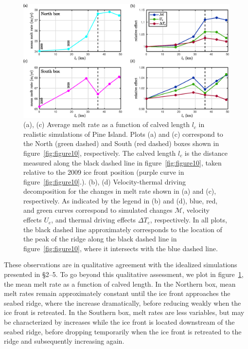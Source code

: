 \documentclass[draft]{agujournal2019}
\begin{document}
\begin{figure}
    \centering
    \includegraphics[width = \textwidth]{../make_figures/plots/figure12.eps}
    \caption{(a), (c) Average melt rate as a function of calved length $l_c$ in realistic simulations of Pine Island. Plots (a) and (c) correspond to the North (green dashed) and South (red dashed) boxes shown in figure~\ref{fig:figure10}, respectively. The calved length $l_c$ is the distance measured along the black dashed line in figure~\ref{fig:figure10}, taken relative to the 2009 ice front position (purple curve in figure~\ref{fig:figure10}.). (b), (d) Velocity-thermal driving decomposition for the changes in melt rate shown in (a) and (c), respectively. As indicated by the legend in (b) and (d), blue, red, and green curves correspond to simulated changes $\mathcal{M}$, velocity effects $U_e$, and thermal driving effects $\Delta T_e$, respectively. In all plots, the black dashed line approximately corresponds to the location of the peak of the ridge along the black dashed line in figure~\ref{fig:figure10}, where it intersects with the blue dashed line.}\label{fig:figure12}
\end{figure}

 These observations are in qualitative agreement with the idealized simulations presented in \S2--5. To go beyond this qualitative assessment, we plot in figure~\ref{fig:figure12}, the mean melt rate as a function of calved length. In the Northern box, mean melt rates remain approximately constant until the ice front approaches the seabed ridge, where the increase dramatically, before reducing weakly when the ice front is retreated. In the Southern box, melt rates are less variables, but may be characterized by increases while the ice front is located downstream of the seabed ridge, before dropping temporarily when the ice front is retreated to the ridge and subsequently increasing again. 
 
\end{document}
